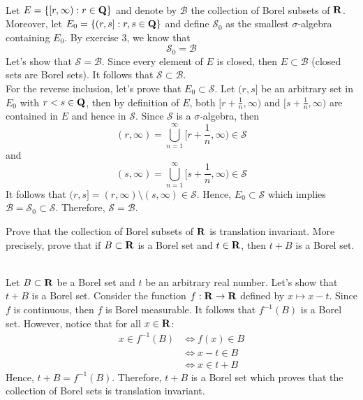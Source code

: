 \begin{solution}
    \\ Let $E = \{[r, \infty):r\in\mathbf{Q}\}$ and denote by $\mathcal{B}$ the collection of Borel subsets of $\mathbf{R}$. Moreover, let $E_0 = \{(r, s]:r,s \in \mathbf{Q}\}$ and define $\mathcal{S}_0$ as the smallest $\sigma$-algebra containing $E_0$. By exercise 3, we know that
    $$\mathcal{S}_0 = \mathcal{B}$$
    Let's show that $\mathcal{S} = \mathcal{B}$. Since every element of $E$ is closed, then $E \subset \mathcal{B}$ (closed sets are Borel sets). It follows that $\mathcal{S} \subset \mathcal{B}$.\\
    For the reverse inclusion, let's prove that $E_0 \subset \mathcal{S}$. Let $(r, s]$ be an arbitrary set in $E_0$ with $r < s \in \mathbf{Q}$, then by definition of $E$, both $[r + \frac{1}{n}, \infty)$ and $[s + \frac{1}{n}, \infty)$ are contained in $E$ and hence in $\mathcal{S}$. Since $\mathcal{S}$ is a $\sigma$-algebra, then
    $$(r, \infty) = \bigcup_{n=1}^{\infty} \biggl[ r + \frac{1}{n}, \infty \biggr) \in \mathcal{S} $$
    and 
    $$(s, \infty) = \bigcup_{n=1}^{\infty} \biggl[ s + \frac{1}{n}, \infty \biggr) \in \mathcal{S} $$
    It follows that $(r, s] = (r, \infty) \setminus (s, \infty) \in \mathcal{S}$. Hence, $E_0 \subset \mathcal{S}$ which implies $\mathcal{B} = \mathcal{S}_0 \subset \mathcal{S}$. Therefore, $\mathcal{S} = \mathcal{B}$. \\
\end{solution}

\begin{exercise}
    Prove that the collection of Borel subsets of $\mathbf{R}$ is translation invariant. More precisely, prove that if $B \subset \mathbf{R}$ is a Borel set and $t \in \mathbf{R}$, then $t+B$ is a Borel set.\\
\end{exercise}

\begin{solution}
    \\ Let $B \subset \mathbf{R}$ be a Borel set and $t$ be an arbitrary real number. Let's show that $t+B$ is a Borel set. Consider the function $f : \mathbf{R} \to \mathbf{R}$ defined by $x \mapsto x - t$. Since $f$ is continuous, then $f$ is Borel measurable. It follows that $f^{-1}(B)$ is a Borel set. However, notice that for all $x \in \mathbf{R}$:
    \begin{align*}
        x \in f^{-1}(B) &\iff f(x) \in B \\
        &\iff x-t \in B \\
        &\iff x \in t + B
    \end{align*}
    Hence,  $t + B = f^{-1}(B)$. Therefore, $t + B$ is a Borel set which proves that the collection of Borel sets is translation invariant.\\
\end{solution}

